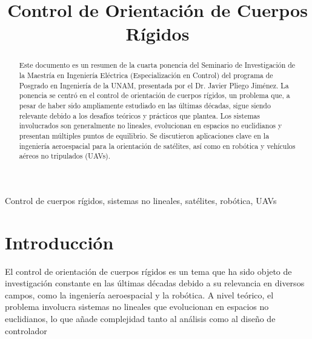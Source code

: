 \documentclass[conference]{IEEEtran}
\begin{document}
\title{Control de Orientación de Cuerpos Rígidos\\
}

\author{
	\and
}

\maketitle

\begin{abstract}
	Este documento es un resumen de la cuarta ponencia del Seminario de Investigación de la Maestría en Ingeniería Eléctrica (Especialización en Control) del programa de Posgrado en Ingeniería de la UNAM, presentada por el Dr. Javier Pliego Jiménez. La ponencia se centró en el control de orientación de cuerpos rígidos, un problema que, a pesar de haber sido ampliamente estudiado en las últimas décadas, sigue siendo relevante debido a los desafíos teóricos y prácticos que plantea. Los sistemas involucrados son generalmente no lineales, evolucionan en espacios no euclidianos y presentan múltiples puntos de equilibrio. Se discutieron aplicaciones clave en la ingeniería aeroespacial para la orientación de satélites, así como en robótica y vehículos aéreos no tripulados (UAVs).
\end{abstract}

\begin{IEEEkeywords}
	Control de cuerpos rígidos, sistemas no lineales, satélites, robótica, UAVs
\end{IEEEkeywords}

\section{Introducción}
El control de orientación de cuerpos rígidos es un tema que ha sido objeto de investigación constante en las últimas décadas debido a su relevancia en diversos campos, como la ingeniería aeroespacial y la robótica. A nivel teórico, el problema involucra sistemas no lineales que evolucionan en espacios no euclidianos, lo que añade complejidad tanto al análisis como al diseño de controlador
\end{document}
